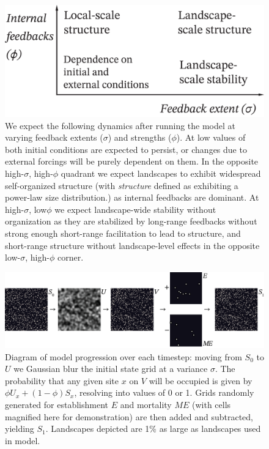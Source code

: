 \documentclass[10pt]{article}
\begin{document}
\begin{figure}
 	\begin{center}
		\includegraphics{f1_Change_space.png}
	\end{center}
		\caption{We expect the following dynamics after running the model at varying feedback extents ($\sigma$) and strengths ($\phi$).  At low values of both initial conditions are expected to persist, or changes due to external forcings will be purely dependent on them. In the opposite high-$\sigma$, high-$\phi$ quadrant we expect landscapes to exhibit widespread self-organized structure (with \textit{structure} defined as exhibiting a power-law size distribution.) as internal feedbacks are dominant. At high-$\sigma$, low$\phi$ we expect landscape-wide stability without organization as they are stabilized by long-range feedbacks without strong enough short-range facilitation to lead to structure, and short-range structure without landscape-level effects in the opposite low-$\sigma$, high-$\phi$ corner.}
\end{figure}

\begin{figure}
 	\begin{center}
		\includegraphics{f2_Model_fig.png}
	\end{center}
		\caption{Diagram of model progression over each timestep: moving from $S_0$ to $U$ we Gaussian blur the initial state grid at a variance $\sigma$. The probability that any given site $x$ on $V$ will be occupied is given by $\phi U_x + (1-\phi)S_x$, resolving into values of 0 or 1. Grids randomly generated for establishment $E$ and mortality $ME$ (with cells magnified here for demonstration) are then added and subtracted, yielding $S_1$. Landscapes depicted are 1\% as large as landscapes used in model.}
\end{figure}
\end{document}
